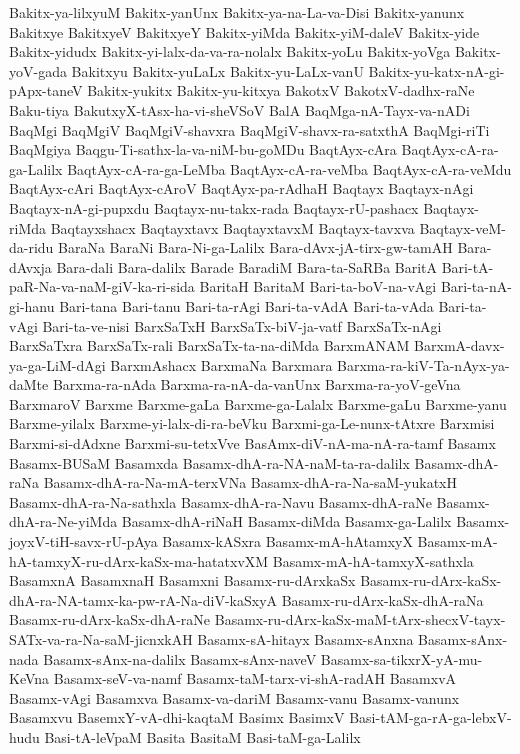 {Bakitx-ya-lilxyuM
Bakitx-yanUnx
Bakitx-ya-na-La-va-Disi
Bakitx-yanunx
Bakitxye
BakitxyeV
BakitxyeY
Bakitx-yiMda
Bakitx-yiM-daleV
Bakitx-yide
Bakitx-yidudx
Bakitx-yi-lalx-da-va-ra-nolalx
Bakitx-yoLu
Bakitx-yoVga
Bakitx-yoV-gada
Bakitxyu
Bakitx-yuLaLx
Bakitx-yu-LaLx-vanU
Bakitx-yu-katx-nA-gi-pApx-taneV
Bakitx-yukitx
Bakitx-yu-kitxya
BakotxV
BakotxV-dadhx-raNe
Baku-tiya
BakutxyX-tAsx-ha-vi-sheVSoV
BalA
BaqMga-nA-Tayx-va-nADi
BaqMgi
BaqMgiV
BaqMgiV-shavxra
BaqMgiV-shavx-ra-satxthA
BaqMgi-riTi
BaqMgiya
Baqgu-Ti-sathx-la-va-niM-bu-goMDu
BaqtAyx-cAra
BaqtAyx-cA-ra-ga-Lalilx
BaqtAyx-cA-ra-ga-LeMba
BaqtAyx-cA-ra-veMba
BaqtAyx-cA-ra-veMdu
BaqtAyx-cAri
BaqtAyx-cAroV
BaqtAyx-pa-rAdhaH
Baqtayx
Baqtayx-nAgi
Baqtayx-nA-gi-pupxdu
Baqtayx-nu-takx-rada
Baqtayx-rU-pashacx
Baqtayx-riMda
Baqtayxshacx
Baqtayxtavx
BaqtayxtavxM
Baqtayx-tavxva
Baqtayx-veM-da-ridu
BaraNa
BaraNi
Bara-Ni-ga-Lalilx
Bara-dAvx-jA-tirx-gw-tamAH
Bara-dAvxja
Bara-dali
Bara-dalilx
Barade
BaradiM
Bara-ta-SaRBa
BaritA
Bari-tA-paR-Na-va-naM-giV-ka-ri-sida
BaritaH
BaritaM
Bari-ta-boV-na-vAgi
Bari-ta-nA-gi-hanu
Bari-tana
Bari-tanu
Bari-ta-rAgi
Bari-ta-vAdA
Bari-ta-vAda
Bari-ta-vAgi
Bari-ta-ve-nisi
BarxSaTxH
BarxSaTx-biV-ja-vatf
BarxSaTx-nAgi
BarxSaTxra
BarxSaTx-rali
BarxSaTx-ta-na-diMda
BarxmANAM
BarxmA-davx-ya-ga-LiM-dAgi
BarxmAshacx
BarxmaNa
Barxmara
Barxma-ra-kiV-Ta-nAyx-ya-daMte
Barxma-ra-nAda
Barxma-ra-nA-da-vanUnx
Barxma-ra-yoV-geVna
BarxmaroV
Barxme
Barxme-gaLa
Barxme-ga-Lalalx
Barxme-gaLu
Barxme-yanu
Barxme-yilalx
Barxme-yi-lalx-di-ra-beVku
Barxmi-ga-Le-nunx-tAtxre
Barxmisi
Barxmi-si-dAdxne
Barxmi-su-tetxVve
BasAmx-diV-nA-ma-nA-ra-tamf
Basamx
Basamx-BUSaM
Basamxda
Basamx-dhA-ra-NA-naM-ta-ra-dalilx
Basamx-dhA-raNa
Basamx-dhA-ra-Na-mA-terxVNa
Basamx-dhA-ra-Na-saM-yukatxH
Basamx-dhA-ra-Na-sathxla
Basamx-dhA-ra-Navu
Basamx-dhA-raNe
Basamx-dhA-ra-Ne-yiMda
Basamx-dhA-riNaH
Basamx-diMda
Basamx-ga-Lalilx
Basamx-joyxV-tiH-savx-rU-pAya
Basamx-kASxra
Basamx-mA-hAtamxyX
Basamx-mA-hA-tamxyX-ru-dArx-kaSx-ma-hatatxvXM
Basamx-mA-hA-tamxyX-sathxla
BasamxnA
BasamxnaH
Basamxni
Basamx-ru-dArxkaSx
Basamx-ru-dArx-kaSx-dhA-ra-NA-tamx-ka-pw-rA-Na-diV-kaSxyA
Basamx-ru-dArx-kaSx-dhA-raNa
Basamx-ru-dArx-kaSx-dhA-raNe
Basamx-ru-dArx-kaSx-maM-tArx-shecxV-tayx-SATx-va-ra-Na-saM-jicnxkAH
Basamx-sA-hitayx
Basamx-sAnxna
Basamx-sAnx-nada
Basamx-sAnx-na-dalilx
Basamx-sAnx-naveV
Basamx-sa-tikxrX-yA-mu-KeVna
Basamx-seV-va-namf
Basamx-taM-tarx-vi-shA-radAH
BasamxvA
Basamx-vAgi
Basamxva
Basamx-va-dariM
Basamx-vanu
Basamx-vanunx
Basamxvu
BasemxY-vA-dhi-kaqtaM
Basimx
BasimxV
Basi-tAM-ga-rA-ga-lebxV-hudu
Basi-tA-leVpaM
Basita
BasitaM
Basi-taM-ga-Lalilx
}
